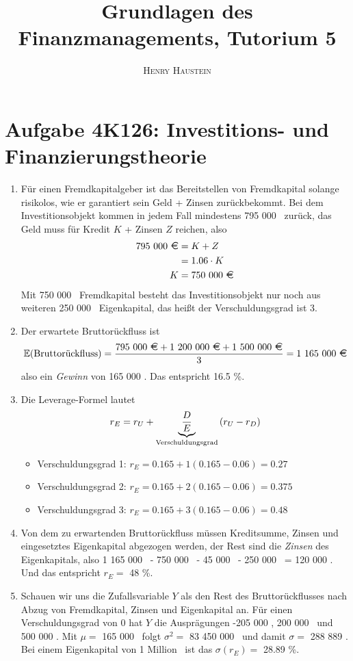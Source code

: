 \documentclass{article}
\title{\textbf{Grundlagen des Finanzmanagements, Tutorium 5}}
\author{\textsc{Henry Haustein}}
\date{}
\newcommand{\E}{\mathbb{E}}
\begin{document}
	\maketitle
	
	\section*{Aufgabe 4K126: Investitions- und Finanzierungstheorie}
	\begin{enumerate}[label=(\alph*)]
		\item Für einen Fremdkapitalgeber ist das Bereitstellen von Fremdkapital solange risikolos, wie er garantiert sein Geld + Zinsen zurückbekommt. Bei dem Investitionsobjekt kommen in jedem Fall mindestens 795 000 \EUR\, zurück, das Geld muss für Kredit $K$ + Zinsen $Z$ reichen, also
		\begin{align}
			\text{795 000 \EUR} &= K + Z \notag \\
			&= 1.06\cdot K \notag \\
			K &= \text{750 000 \EUR} \notag
		\end{align}
		Mit 750 000 \EUR\, Fremdkapital besteht das Investitionsobjekt nur noch aus weiteren 250 000 \EUR\, Eigenkapital, das heißt der Verschuldungsgrad ist 3.
		\item Der erwartete Bruttorückfluss ist
		\begin{align}
			\E(\text{Bruttorückfluss}) = \frac{\text{795 000 \EUR} + \text{1 200 000 \EUR} + \text{1 500 000 \EUR}}{3} = \text{1 165 000 \EUR} \notag
		\end{align}
		also ein \textit{Gewinn} von 165 000 \EUR. Das entspricht 16.5 \%.
		\item Die Leverage-Formel lautet
		\begin{align}
			r_E = r_U + \underbrace{\frac{D}{E}}_{\text{Verschuldungsgrad}}\left(r_U - r_D\right) \notag
		\end{align}
		\begin{itemize}
			\item Verschuldungsgrad 1: $r_E=0.165 + 1(0.165 - 0.06) = 0.27$
			\item Verschuldungsgrad 2: $r_E=0.165 + 2(0.165 - 0.06) = 0.375$
			\item Verschuldungsgrad 3: $r_E=0.165 + 3(0.165 - 0.06) = 0.48$
		\end{itemize}
		\item Von dem zu erwartenden Bruttorückfluss müssen Kreditsumme, Zinsen und eingesetztes Eigenkapital abgezogen werden, der Rest sind die \textit{Zinsen} des Eigenkapitals, also 1 165 000 \EUR\, - 750 000 \EUR\, - 45 000 \EUR\, - 250 000 \EUR\, = 120 000 \EUR. Und das entspricht $r_E = $ 48 \%.
		\item Schauen wir uns die Zufallsvariable $Y$ als den Rest des Bruttorückflusses nach Abzug von Fremdkapital, Zinsen und Eigenkapital an. Für einen Verschuldungsgrad von 0 hat $Y$ die Ausprägungen -205 000 \EUR, 200 000 \EUR\, und 500 000 \EUR. Mit $\mu=$ 165 000 \EUR\, folgt $\sigma^2=$ 83 450 000 \EUR\, und damit $\sigma=$ 288 889 \EUR. Bei einem Eigenkapital von 1 Million \EUR\, ist das $\sigma(r_E)=$ 28.89 \%. 
		

\end{enumerate}
\end{document}
